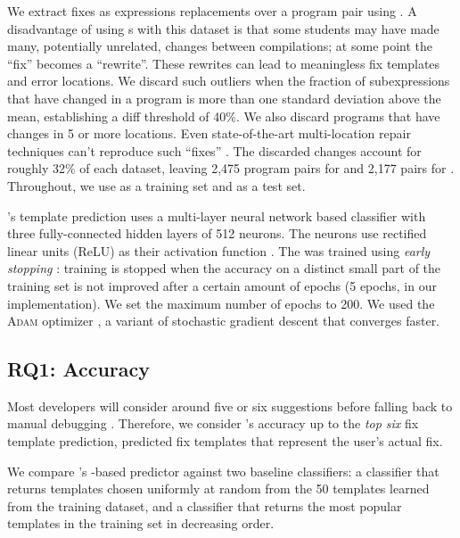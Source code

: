 %
We extract fixes as expressions replacements over a program pair using \diffsym.
A disadvantage of using \diffsym s with this dataset is that some students may have
made many, potentially unrelated, changes between compilations; at some point
the ``fix'' becomes a ``rewrite''. These rewrites can lead to
meaningless fix templates and error locations. We discard such outliers when the
fraction of subexpressions that have changed in a program is more than one
standard deviation above the mean, establishing a diff threshold of 40\%. We
also discard programs that have changes in 5 or more locations. Even
state-of-the-art multi-location repair techniques can't reproduce such ``fixes''
\citep{Saha_2019}. The discarded changes account for roughly 32\% of each
dataset, leaving 2,475 program pairs for \SPRING and 2,177 pairs for \FALL.
Throughout, we use \SPRING as a training set and \FALL as a test set.

%
\toolname's template prediction 
uses a multi-layer neural network \dnn based 
classifier with three fully-connected 
hidden layers of 512 neurons. The neurons use
rectified linear units (ReLU) as their activation 
function \citep{Nair2010-xg}.
%
The \dnn was trained using \emph{early stopping} 
\cite{Hastie2009-bn}: 
training is stopped when the accuracy on a distinct
small part of the training set is not improved after
a certain amount of epochs (5 epochs, in our implementation).
%
We set the maximum number of epochs to 200.
%
We used the \textsc{Adam} optimizer \citep{Kingma2014-ng},
a variant of stochastic gradient descent that converges faster.

\subsection{RQ1: Accuracy}

\label{sec:eval:accuracy}

Most developers will consider around five or six suggestions before
falling back to manual debugging \citep{Kochhar2016-oc}. 
%
Therefore, we consider \toolname's accuracy up to the \emph{top six} 
fix template prediction, \ie predicted fix templates that represent 
the user's actual fix. 

%
We compare \toolname's \dnn-based predictor against two baseline 
classifiers: a \random classifier that returns 
templates 
chosen uniformly at random from the 50 templates 
learned from the \SPRING training dataset, and 
a \popular classifier that returns the most 
popular templates in the training set in 
decreasing order. 

